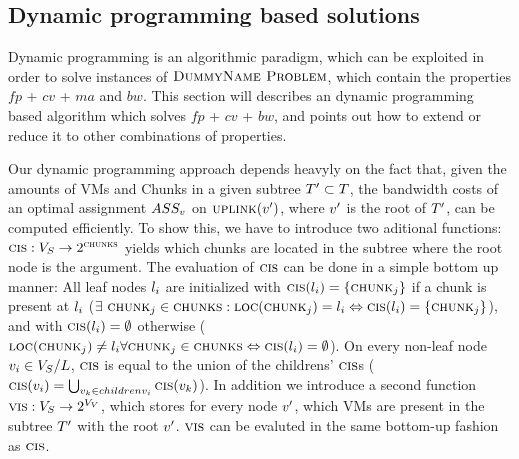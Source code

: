 \subsection{Dynamic programming based solutions}

Dynamic programming is an algorithmic paradigm, which can be exploited in 
order to solve instances of $\textsc{DummyName Problem}$, which contain the properties $fp$ + 
$cv$ + $ma$ and $bw$. This section will describes an dynamic programming based 
algorithm which solves $fp$ + $cv$ + $bw$, and points out how to extend or 
reduce it to other combinations of properties.




\newcommand{\Opt}{\ensuremath{Opt}}
\newcommand{\Children}{\ensuremath{children}}

\newcommand{\Uplink}{\ensuremath{\textsc{uplink}}}
\newcommand{\ChunkCount}{\ensuremath{\textsc{cis}}}
\newcommand{\VmCount}{\ensuremath{\textsc{vis}}}
\newcommand{\Right}{\ensuremath{r}}
\newcommand{\InverseAssignment}{\ensuremath{\VmChunkAssignment^{-1}}}

Our dynamic programming approach depends heavyly on the fact that, given the 
amounts of VMs and Chunks in a given subtree $T' \subset T$, the 
bandwidth costs of an optimal assignment $ASS_v$ on 
$\Uplink(\SubstrateNode')$, where $v'$ is the root of $T'$, 
can be computed efficiently. To show this, we have to introduce two aditional 
functions: $\ChunkCount : \SubstrateNodes 
\rightarrow 
2^\Chunks$ yields which chunks are located in the subtree where the root node 
is the argument. The evaluation of $\ChunkCount$ can be done in a 
simple bottom 
up manner: All leaf nodes $l_i$ are initialized with $\ChunkCount(\Leaf_i) 
= \{\Chunk_j\}$ if a chunk is present at $l_i$ ($\exists ~ \Chunk_j \in 
\Chunks : \ChunkLocation(\Chunk_j) = \Leaf_i \Leftrightarrow 
\ChunkCount(\Leaf_i) = \{\Chunk_j\}$), and with $\ChunkCount(\Leaf_i) = 
\emptyset$ otherwise ($\ChunkLocation(\Chunk_j) \neq \Leaf_i \forall \Chunk_j 
\in 
\Chunks \Leftrightarrow \ChunkCount(\Leaf_i) = \emptyset$). On every non-leaf 
node $v_i \in V_S / L$, $\ChunkCount$ is equal 
to the union of the childrens' $\ChunkCount$s
($\ChunkCount(\SubstrateNode_i) 
= \bigcup_{\SubstrateNode_k \in \Children{\SubstrateNode_i}} 
\ChunkCount(\SubstrateNode_k)$). In addition we introduce a second function 
$\VmCount : \SubstrateNodes \rightarrow 2^{\VirtualNodes}$, which stores for 
every node $v'$, which VMs are present in the subtree $T'$ 
with the root $v'$. $\VmCount$ can be evaluted in the 
same bottom-up fashion as $\ChunkCount$.

